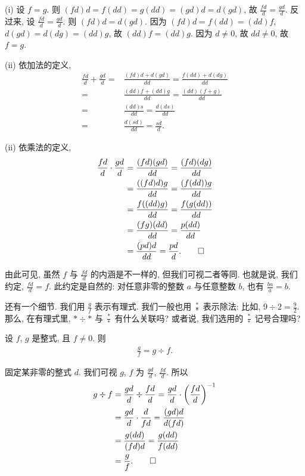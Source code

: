 \begin{pf}
    (i) 设 $f = g$. 则 $(fd)d = f(dd) = g(dd) = (gd)d = d(gd)$, 故 $\frac{fd}{d} = \frac{gd}{d}$. 反过来, 设 $\frac{fd}{d} = \frac{gd}{d}$. 则 $(fd)d = d(gd)$. 因为 $(fd)d = f(dd) = (dd)f$, $d(gd) = d(dg) = (dd)g$, 故 $(dd)f = (dd)g$. 因为 $d \neq 0$, 故 $dd \neq 0$, 故 $f = g$.

    (ii) 依加法的定义,
    \begin{align*}
        \frac{fd}{d} + \frac{gd}{d}
        = {} & \frac{(fd)d + d(gd)}{dd} = \frac{f(dd) + d(dg)}{dd} \\
        = {} & \frac{(dd)f + (dd)g}{dd} = \frac{(dd)(f + g)}{dd}   \\
        = {} & \frac{(dd)s}{dd} = \frac{d(ds)}{dd}                 \\
        = {} & \frac{d(sd)}{dd} = \frac{sd}{d}.
    \end{align*}

    (ii) 依乘法的定义,
    \begin{align*}
        \frac{fd}{d} \cdot \frac{gd}{d}
        = {} & \frac{(fd)(gd)}{dd} = \frac{(fd)(dg)}{dd} \\
        = {} & \frac{((fd)d)g}{dd} = \frac{(f(dd))g}{dd} \\
        = {} & \frac{f((dd)g)}{dd} = \frac{f(g(dd))}{dd} \\
        = {} & \frac{(fg)(dd)}{dd} = \frac{p(dd)}{dd}    \\
        = {} & \frac{(pd)d}{dd} = \frac{pd}{d}. \qedhere
    \end{align*}
\end{pf}

由此可见, 虽然 $f$ 与 $\frac{fd}{d}$ 的内涵是不一样的, 但我们可视二者等同. 也就是说, 我们约定, $\frac{fd}{d} = f$. 此约定是自然的: 对任意非零的整数 $a$ 与任意整数 $b$, 也有 $\frac{ba}{a} = b$.

还有一个细节. 我们用 $\frac{g}{f}$ 表示有理式. 我们一般也用 $\frac{\ast}{\ast}$ 表示除法: 比如, $9 \div 2 = \frac{9}{2}$. 那么, 在有理式里, $\ast \div \ast$ 与 $\frac{\ast}{\ast}$ 有什么关联吗? 或者说, 我们选用的 $\frac{\ast}{\ast}$ 记号合理吗?

\begin{proposition}
    设 $f$, $g$ 是整式, 且 $f \neq 0$. 则
    \begin{align*}
        \frac{g}{f} = g \div f.
    \end{align*}
\end{proposition}

\begin{pf}
    固定某非零的整式 $d$. 我们可视 $g$, $f$ 为 $\frac{gd}{d}$, $\frac{fd}{d}$. 所以
    \begin{align*}
        g \div f
        = {} & \frac{gd}{d} \div \frac{fd}{d}
        = \frac{gd}{d} \cdot \left( \frac{fd}{d} \right)^{-1} \\
        = {} & \frac{gd}{d} \cdot \frac{d}{fd}
        = \frac{(gd)d}{d(fd)}                                 \\
        = {} & \frac{g(dd)}{(fd)d}
        = \frac{g(dd)}{f(dd)}                                 \\
        = {} & \frac{g}{f}. \qedhere
    \end{align*}
\end{pf}

